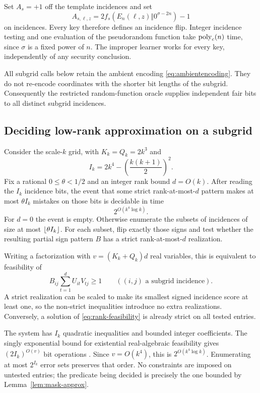 Set $A_s=+1$ off the template incidences and set
\[
 A_{s,\ell,z}=2f_s(E_n(\ell,z)\Vert0^{\sigma-2n})-1
\]
on incidences. Every key therefore defines an incidence flip. Integer incidence testing and one evaluation of the pseudorandom function take $\operatorname{poly}_c(n)$ time, since $\sigma$ is a fixed power of $n$. The improper learner works for every key, independently of any security conclusion.

All subgrid calls below retain the ambient encoding \eqref{eq:ambientencoding}. They do not re-encode coordinates with the shorter bit lengths of the subgrid. Consequently the restricted random-function oracle supplies independent fair bits to all distinct subgrid incidences.

\subsection{Deciding low-rank approximation on a subgrid}
Consider the scale-$k$ grid, with $K_k=Q_k=2k^3$ and
\[
 I_k=2k^4-\left(\frac{k(k+1)}2\right)^2.
\]
Fix a rational $0\le\theta<1/2$ and an integer rank bound $d=O(k)$. After reading the $I_k$ incidence bits, the event that some strict rank-at-most-$d$ pattern makes at most $\theta I_k$ mistakes on those bits is decidable in time
\begin{equation}
 2^{O(k^4\log k)}.
\label{eq:decisiontime}
\end{equation}
For $d=0$ the event is empty. Otherwise enumerate the subsets of incidences of size at most $\lfloor \theta I_k\rfloor$. For each subset, flip exactly those signs and test whether the resulting partial sign pattern $B$ has a strict rank-at-most-$d$ realization.

Writing a factorization with $v=(K_k+Q_k)d$ real variables, this is equivalent to feasibility of
\begin{equation}
 B_{ij}\sum_{t=1}^{d}U_{it}V_{tj}\ge1
 \qquad((i,j)\text{ a subgrid incidence}).
\label{eq:rank-feasibility}
\end{equation}
A strict realization can be scaled to make its smallest signed incidence score at least one, so the non-strict inequalities introduce no extra realizations. Conversely, a solution of \eqref{eq:rank-feasibility} is already strict on all tested entries.

The system has $I_k$ quadratic inequalities and bounded integer coefficients. The singly exponential bound for existential real-algebraic feasibility gives $(2I_k)^{O(v)}$ bit operations \citep{Renegar92a,Renegar92b,Renegar92c}. Since $v=O(k^4)$, this is $2^{O(k^4\log k)}$. Enumerating at most $2^{I_k}$ error sets preserves that order. No constraints are imposed on untested entries; the predicate being decided is precisely the one bounded by Lemma~\ref{lem:mask-approx}.

